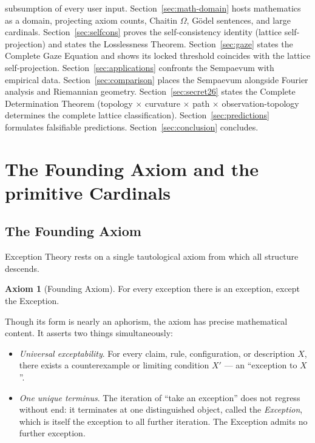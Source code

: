 \documentclass[11pt,a4paper]{article}
\theoremstyle{definition}
\newtheorem{axiom}[theorem]{Axiom}
\theoremstyle{remark}
\begin{document}
subsumption of every user input. Section~\ref{sec:math-domain} hosts mathematics as a domain, projecting axiom counts, Chaitin $\Omega$, G\"odel sentences, and large cardinals. Section~\ref{sec:selfcons} proves the self-consistency identity (lattice self-projection) and states the Losslessness Theorem. Section~\ref{sec:gaze} states the Complete Gaze Equation and shows its locked threshold coincides with the lattice self-projection. Section~\ref{sec:applications} confronts the Sempaevum with empirical data. Section~\ref{sec:comparison} places the Sempaevum alongside Fourier analysis and Riemannian geometry. Section~\ref{sec:secret26} states the Complete Determination Theorem (topology $\times$ curvature $\times$ path $\times$ observation-topology determines the complete lattice classification). Section~\ref{sec:predictions} formulates falsifiable predictions. Section~\ref{sec:conclusion} concludes.

\section{The Founding Axiom and the primitive Cardinals}\label{sec:primitives}

\subsection{The Founding Axiom}

Exception Theory rests on a single tautological axiom from which all structure descends.

\begin{axiom}[Founding Axiom]\label{ax:founding}
For every exception there is an exception, except the Exception.
\end{axiom}

Though its form is nearly an aphorism, the axiom has precise mathematical content. It asserts two things simultaneously:
\begin{itemize}[leftmargin=*]
\item \emph{Universal exceptability}. For every claim, rule, configuration, or description $X$, there exists a counterexample or limiting condition $X'$ --- an ``exception to $X$''.
\item \emph{One unique terminus}. The iteration of ``take an exception'' does not regress without end: it terminates at one distinguished object, called the \emph{Exception}, which is itself the exception to all further iteration. The Exception admits no further exception.
\end{itemize}
\end{document}
